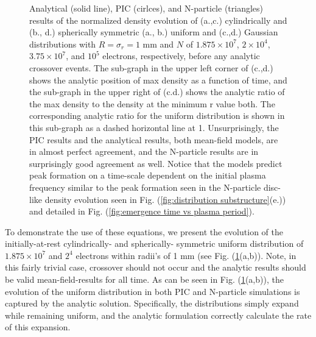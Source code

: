 \documentclass[aps,prl,twocolumn,showpacs,superscriptaddress,groupedaddress]{revtex4-1}  %
\begin{document}
{\begin{figure}
\begin{tabular}{cc}
  \end{tabular}
\caption{\label{fig:density evolution} Analytical (solid line), PIC (cirlces), and N-particle (triangles) results of the normalized density 
evolution of (a.,c.) cylindrically and (b., d.) spherically symmetric 
(a., b.) uniform and (c.,d.) Gaussian distributions with $R = \sigma_r = 1 $ mm and  $N$ of $1.875 \times 10^7$, $2 \times 10^4$, $3.75 \times 10^7$,
and $10^5$ electrons, respectively,
before any analytic crossover events.  The sub-graph
in the upper left corner of (c.,d.) shows 
the analytic position of max density as a function of time, and the sub-graph in the upper right of (c.d.) shows the analytic ratio of the
max density to the density at the minimum r value both.  The corresponding analytic ratio for the uniform distribution is shown in this sub-graph
as a dashed horizontal line at 1.   Unsurprisingly, the 
PIC results and the analytical results, both mean-field models, are in almost perfect agreement, and the N-particle results
are in surprisingly good agreement as well.
Notice that the models predict peak formation on a time-scale dependent on the initial plasma frequency similar to the peak formation seen
in the N-particle disc-like density evolution seen in Fig. (\ref{fig:distribution substructure}(e.)) and detailed in Fig. (\ref{fig:emergence time vs plasma period}).}
\end{figure} 

To demonstrate the use of these equations, we present the evolution of the initially-at-rest cylindrically- and spherically- symmetric uniform distribution of
$1.875 \times 10^7$ and $2^4$ electrons within radii's of 1 mm (see Fig. (\ref{fig:density evolution}(a,b)).  Note, in this fairly trivial case, crossover should not 
occur and the analytic results should be valid mean-field-results for all time.  As can be seen in Fig. (\ref{fig:density evolution}(a,b)), the evolution of the uniform 
distribution in 
both PIC and N-particle simulations is captured by the analytic solution.  Specifically, the distributions simply expand while remaining uniform, 
and the analytic formulation correctly calculate the rate of this expansion.  

}
\end{document}
